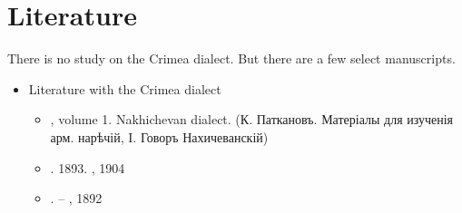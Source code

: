 \begin{table}[H]
	\centering
	\caption{Participles or converbs <> for the verb `to like' in the Crimea dialect}
	\label{tab:Crimea:morpho:verb:paradigm:participle}
\end{table}

\begin{adjarianpage}\label{page:266}\end{adjarianpage}%


\section{Literature}

There is no study on the Crimea dialect. But there are a few select manuscripts. 


{\litoverview}

\begin{itemize}
	\item Literature with the Crimea dialect
	\begin{itemize}
		\item \citet{Patkanian-1875-RussianDialects}, volume 1. Nakhichevan dialect. (К. Паткановъ. Матеріалы для изученія арм. нарѣчій, I. Говоръ Нахичеванскій)
		\item {}. 1893. , 1904
		\item {}. – , 1892
	\end{itemize}
\end{itemize}


